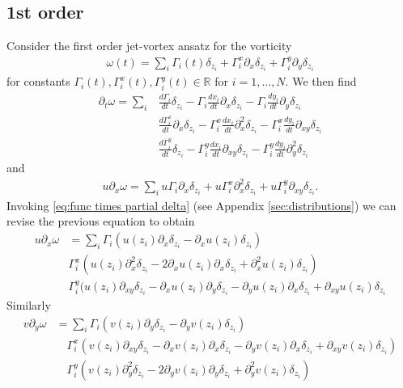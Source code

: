 \documentclass[12pt]{amsart}
\newcommand{\R}{\ensuremath{\mathbb{R}}}
\theoremstyle{remark}
\begin{document}
\subsection{1st order}
Consider the first order jet-vortex ansatz for the vorticity
\begin{align}
  \omega(t) = \sum_{i} \Gamma_i(t) \delta_{z_i} 
  + \Gamma_i^x \partial_x \delta_{z_i}
  + \Gamma_i^y \partial_y \delta_{z_i}\label{eq:ansatz 1}
\end{align}
for constants $\Gamma_i(t),\Gamma_i^x(t),\Gamma_i^y(t) \in \R$ for $i = 1,\dots,N$.
We then find
\begin{align*}
  \partial_t \omega = \sum_{i} & \frac{d \Gamma_i}{dt} \delta_{z_i} 
  - \Gamma_i \frac{dx_i}{dt} \partial_x \delta_{z_i}
  - \Gamma_i \frac{dy_i}{dt} \partial_y \delta_{z_i} \\
  &\frac{d \Gamma_i^x}{dt} \partial_x\delta_{z_i} 
  - \Gamma_i^x \frac{dx_i}{dt} \partial_x^2 \delta_{z_i}
  - \Gamma_i^x \frac{dy_i}{dt} \partial_{xy} \delta_{z_i} \\
  &\frac{d \Gamma_i^y}{dt} \delta_{z_i} 
  - \Gamma_i^y \frac{dx_i}{dt} \partial_{xy} \delta_{z_i}
  - \Gamma_i^y \frac{dy_i}{dt} \partial_y^2 \delta_{z_i}
\end{align*}
and
\begin{align*}
  u \partial_x \omega = \sum_{i} u \Gamma_i \partial_x \delta_{z_i}
  + u \Gamma_i^x \partial_x^2 \delta_{z_i} 
  + u \Gamma_i^y \partial_{xy} \delta_{z_i}.
\end{align*}
Invoking \eqref{eq:func times partial delta} (see Appendix
\ref{sec:distributions}) we can revise the previous equation to
obtain
\begin{align*}
  u \partial_x \omega &= \sum_{i} \Gamma_i ( u(z_i) \partial_x \delta_{z_i} - \partial_x u(z_i) \delta_{z_i} ) \\
   &\Gamma_i^x (u(z_i) \partial_x^2 \delta_{z_i} 
   - 2\partial_x u(z_i) \partial_x \delta_{z_i}
   + \partial_x^2u(z_i) \delta_{z_i} ) \\
   &\Gamma_i^y ( u(z_i) \partial_{xy} \delta_{z_i} 
   - \partial_x u(z_i) \partial_y \delta_{z_i} 
   - \partial_y u(z_i) \partial_x \delta_{z_i} 
   + \partial_{xy}u(z_i) \delta_{z_i}
\end{align*}
Similarly
\begin{align*}
    v \partial_y \omega &= \sum_{i} \Gamma_i ( v(z_i) \partial_y \delta_{z_i} - \partial_y v(z_i) \delta_{z_i} ) \\
   &\quad \Gamma_i^x (v(z_i) \partial_{xy} \delta_{z_i} 
   - \partial_x v(z_i) \partial_x \delta_{z_i}
   - \partial_y v(z_i) \partial_x \delta_{z_i}
   + \partial_{xy} v(z_i) \delta_{z_i} ) \\
   &\quad \Gamma_i^y ( v(z_i) \partial_{y}^2 \delta_{z_i} 
   - 2\partial_y v(z_i) \partial_y \delta_{z_i} 
   + \partial_{y}^2v(z_i) \delta_{z_i})
\end{align*}
\end{document}
